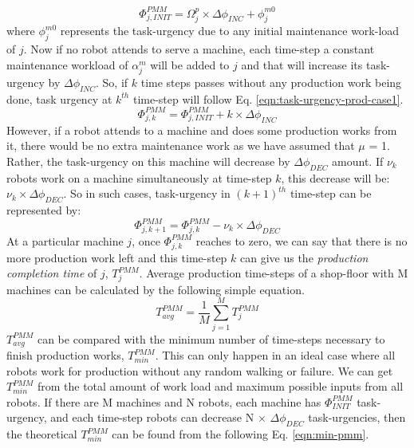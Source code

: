 \begin{equation}
\Phi_{j, INIT}^{PMM} = \Omega_{j}^{p} \times \Delta \phi_{INC} + \phi_{j}^{m0}
\label{eqn:task-urgency-prod-init}
\end{equation}
where $\phi_{j}^{m0}$ represents the task-urgency due to any initial maintenance work-load of $j$.
Now if no robot attends to serve a machine, each time-step a constant maintenance workload of $\alpha_{j}^{m}$ will be added to $j$ and that will increase its task-urgency by $\Delta \phi_{INC}$. So, if $k$ time steps passes without any production work being done, task urgency at $k^{th}$ time-step will follow Eq. \ref{eqn:task-urgency-prod-case1}.
\begin{equation}
\Phi_{j, k}^{PMM} =\Phi_{j, INIT}^{PMM} + k \times \Delta \phi_{INC}
\label{eqn:task-urgency-prod-case1}
\end{equation}
However, if a robot attends to a machine and does some production works from it, there would be no extra maintenance work as we have assumed that $\mu$ = 1. Rather, the task-urgency on this machine will decrease by $\Delta \phi_{DEC}$ amount. If $\nu_{k}$ robots work on a machine simultaneously at time-step $k$, this decrease will be: $\nu_{k} \times \Delta \phi_{DEC}$. So in such cases, task-urgency in $(k+1)^{th}$ time-step can be represented by:
\begin{equation}
\Phi_{j, k+1}^{PMM} = \Phi_{j, k}^{PMM} - \nu_{k} \times \Delta \phi_{DEC}
\label{eqn:task-urgency-prod-case2}
\end{equation}
At a particular machine $j$, once $\Phi_{j, k}^{PMM}$ reaches to zero, we can say that there is no more production work left and this time-step $k$ can give us the {\em production completion time} of $j$, $T_{j}^{PMM}$. Average production time-steps of a shop-floor with M machines can be calculated by the following simple equation.
\begin{equation}
T_{avg}^{PMM} = \frac{1}{M} \sum_{j=1}^{M} T_{j}^{PMM} 
\label{eqn:avg-pmm}
\end{equation}
$T_{avg}^{PMM}$ can be compared with the minimum number of time-steps necessary to finish production works, $T_{min}^{PMM}$. This can only happen in an ideal case where all robots work for production without any random walking or failure. We can get $T_{min}^{PMM}$ from the total amount of work load and maximum possible inputs from all robots. If there are M machines and N robots, each machine has $\Phi_{INIT}^{PMM}$ task-urgency, and each time-step robots can decrease N $\times$ $\Delta \phi_{DEC}$ task-urgencies, then the theoretical $T_{min}^{PMM}$ can be found from the following Eq. \ref{eqn:min-pmm}.
